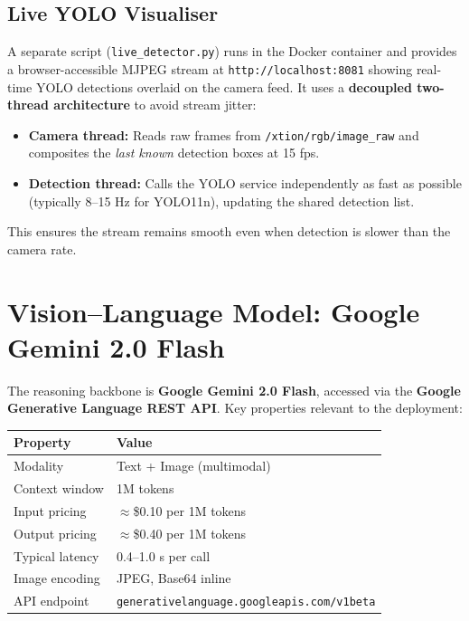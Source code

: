\documentclass[12pt,a4paper]{report}
\begin{document}
\subsection{Live YOLO Visualiser}

A separate script (\texttt{live\_detector.py}) runs in the Docker container and provides
a browser-accessible MJPEG stream at \texttt{http://localhost:8081} showing real-time
YOLO detections overlaid on the camera feed.  It uses a \textbf{decoupled two-thread
architecture} to avoid stream jitter:

\begin{itemize}[noitemsep]
  \item \textbf{Camera thread:} Reads raw frames from \texttt{/xtion/rgb/image\_raw} and
        composites the \emph{last known} detection boxes at 15 fps.
  \item \textbf{Detection thread:} Calls the YOLO service independently as fast as possible
        (typically 8--15 Hz for YOLO11n), updating the shared detection list.
\end{itemize}

This ensures the stream remains smooth even when detection is slower than the camera rate.

\section{Vision--Language Model: Google Gemini 2.0 Flash}

The reasoning backbone is \textbf{Google Gemini 2.0 Flash}, accessed via the
\textbf{Google Generative Language REST API}.  Key properties relevant to the deployment:

\begin{center}
\begin{tabular}{ll}
\toprule
\textbf{Property} & \textbf{Value} \\
\midrule
Modality          & Text + Image (multimodal) \\
Context window    & 1M tokens \\
Input pricing     & $\approx$\$0.10 per 1M tokens \\
Output pricing    & $\approx$\$0.40 per 1M tokens \\
Typical latency   & 0.4--1.0 s per call \\
Image encoding    & JPEG, Base64 inline \\
API endpoint      & \texttt{generativelanguage.googleapis.com/v1beta} \\
\bottomrule
\end{tabular}
\end{center}
\end{document}
